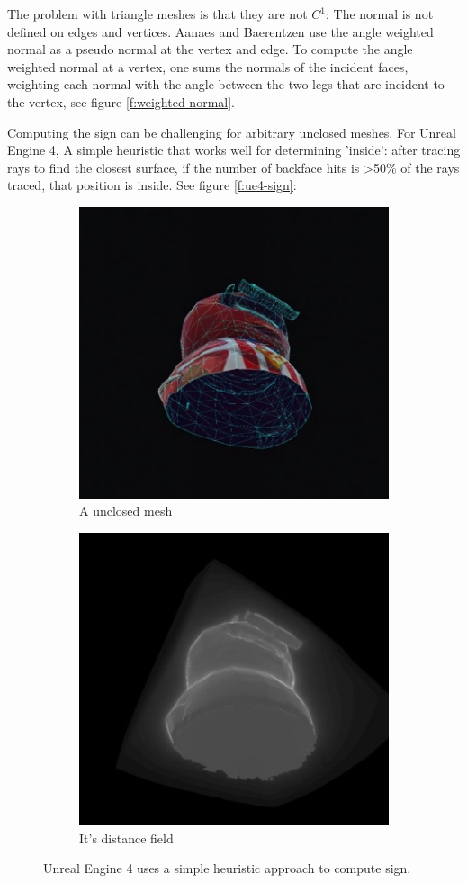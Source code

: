 The problem with triangle meshes is that they are not $C^{1}$: The normal is not defined on edges and vertices. Aanaes and Baerentzen use the angle weighted normal as a pseudo normal at the vertex and edge. To compute the angle weighted normal at a vertex, one sums the normals of the incident faces, weighting each normal with the angle between the two legs that are incident to the vertex, see figure \ref{f:weighted-normal}.


Computing the sign can be challenging for arbitrary unclosed meshes. For Unreal Engine 4, A simple heuristic that works well for determining 'inside': after tracing rays to find the closest surface, if the number of backface hits is >50\% of the rays traced, that position is inside. See figure \ref{f:ue4-sign}: 

\begin{figure}\label{f:ue4-sign}
	\begin{subfigure}[b]{0.5\textwidth}
		\includegraphics{graphics/df/ue4-sign-1}
		\caption{A unclosed mesh}
	\end{subfigure}
	\begin{subfigure}[b]{0.5\textwidth}
		\includegraphics{graphics/df/ue4-sign-2}
		\caption{It's distance field}
	\end{subfigure}
	\caption{Unreal Engine 4 uses a simple heuristic approach to compute sign.}
\end{figure}


